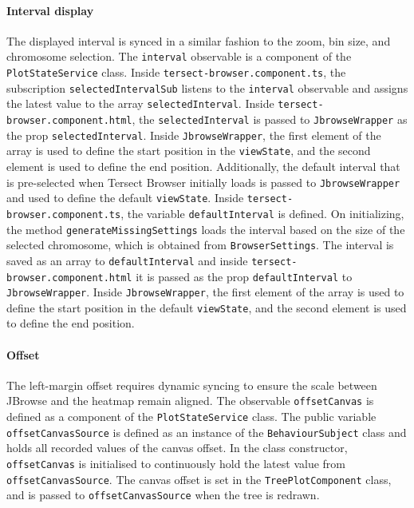 \documentclass[12pt]{article}
\begin{document}
\paragraph{Interval display}
The displayed interval is synced in a similar fashion to the zoom, bin size, and chromosome selection. The \verb +interval+ observable is a component of the \verb +PlotStateService+ class. Inside \verb +tersect-browser.component.ts+, the subscription \verb +selectedIntervalSub+ listens to the \verb +interval+ observable and assigns the latest value to the array \verb +selectedInterval+. Inside \verb +tersect-browser.component.html+, the \verb +selectedInterval+ is passed to \verb +JbrowseWrapper+ as the prop \verb +selectedInterval+. Inside \verb +JbrowseWrapper+, the first element of the array is used to define the start position in the \verb +viewState+, and the second element is used to define the end position. 
Additionally, the default interval that is pre-selected when Tersect Browser initially loads is passed to \verb +JbrowseWrapper+ and used to define the default \verb +viewState+. Inside \verb +tersect-browser.component.ts+, the variable \verb +defaultInterval+ is defined. On initializing, the method \verb +generateMissingSettings+ loads the interval based on the size of the selected chromosome, which is obtained from \verb +BrowserSettings+. The interval is saved as an array to \verb +defaultInterval+ and inside \verb +tersect-browser.component.html+ it is passed as the prop \verb +defaultInterval+ to \verb +JbrowseWrapper+. Inside \verb +JbrowseWrapper+, the first element of the array is used to define the start position in the default \verb +viewState+, and the second element is used to define the end position. 

\paragraph{Offset}
The left-margin offset requires dynamic syncing to ensure the scale between JBrowse and the heatmap remain aligned. The observable \verb +offsetCanvas+ is defined as a component of the \verb +PlotStateService+ class. The public variable \verb +offsetCanvasSource+ is defined as an instance of the \verb +BehaviourSubject+ class and holds all recorded values of the canvas offset. In the class constructor, \verb +offsetCanvas+ is initialised to continuously hold the latest value from \verb +offsetCanvasSource+. The canvas offset is set in the \verb +TreePlotComponent+ class, and is passed to \verb +offsetCanvasSource+ when the tree is redrawn. 
\end{document}
